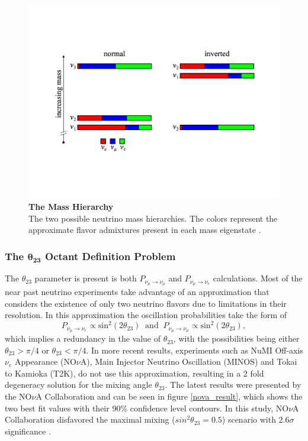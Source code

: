 \begin{figure}
	\begin{center}
		\includegraphics[scale=0.5]{Figures/mass_hierarchy.pdf}
		\caption[The Mass Hierarchy]{ {\textbf{The Mass Hierarchy}}\\The two possible neutrino mass hierarchies. The colors represent the approximate flavor admixtures present in each mass eigenstate \cite{prospects_patterson}.}
		\label{mass_hierarchy}	
	\end{center}
\end{figure}

\subsubsection{The $\mathbf{\theta_{23}}$ Octant Definition Problem}

The $\theta_{23}$ parameter is present is both $P_{\nu_\mu \rightarrow \nu_\mu}$ and $P_{\nu_\mu \rightarrow \nu_e}$ calculations. Most of the near past neutrino experiments take advantage of an approximation that considers the existence of only two neutrino flavors due to limitations in their resolution. In this approximation the oscillation probabilities take the form of
%
\begin{equation}
	P_{\nu_\mu \rightarrow \nu_e} \propto \text{sin}^2(2\theta_{23}) \ \text{ and } \ P_{\nu_\mu \rightarrow \nu_\mu} \propto \text{sin}^2(2\theta_{23}),
	\nonumber
\end{equation}
%
which implies a redundancy in the value of $\theta_{23}$, with the possibilities being either $\theta_{23} > \pi/4$ or $\theta_{23} < \pi/4$. 
In more recent results, experiments such as NuMI Off-axis $\nu_e$ Appearance (NO$\nu$A), Main Injector Neutrino Oscillation (MINOS) and Tokai to Kamioka (T2K), do not use this approximation, resulting in a 2 fold degeneracy solution for the mixing angle $\theta_{23}$. The latest results were presented by the NO$\nu$A Collaboration and can be seen in figure \ref{nova_result}, which shows the two best fit values with their 90\% confidence level contours. In this study, NO$\nu$A Collaboration disfavored the maximal mixing ($sin^2 \theta_{23} = 0.5$) scenario with $2.6 \sigma$ significance \cite{NOVA}.

